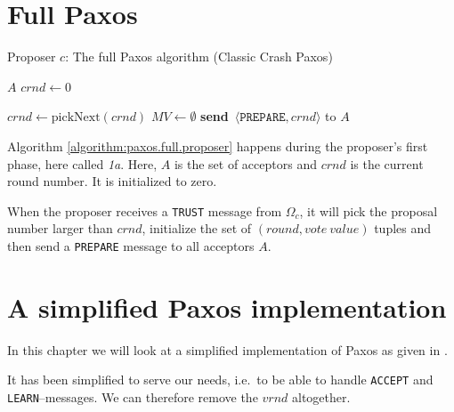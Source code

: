 \section{Full Paxos}


\begin{algorithm}[H]
  \caption{Proposer $c$: The full Paxos algorithm (Classic Crash Paxos)}
  \label{algorithm:paxos.full.proposer}
  \begin{algorithmic}
    \State $A$
    \State $crnd \leftarrow 0$

      \State $crnd \leftarrow \text{pickNext}(crnd)$
      \State $MV \leftarrow \emptyset$
      \State \textbf{send}~$\langle \texttt{PREPARE}, crnd \rangle$ to $A$
    \EndOn
  \end{algorithmic}
\end{algorithm}

Algorithm \ref{algorithm:paxos.full.proposer} happens during the proposer's
first phase, here called \textit{1a}.  Here, $A$ is the set of acceptors and
$crnd$ is the current round number.  It is initialized to zero.

When the proposer receives a \texttt{TRUST} message from $\Omega_c$, it will
pick the proposal number larger than $crnd$, initialize the set of
$(round, vote~value)$ tuples and then send a \texttt{PREPARE} message to all
acceptors $A$.

\section{A simplified Paxos implementation}

In this chapter we will look at a simplified implementation of Paxos as
given in \cite{Insane.Paxos}.

It has been simplified to serve our needs, i.e.~to be able to handle
\texttt{ACCEPT} and \texttt{LEARN}--messages.  We can therefore remove the
$vrnd$ altogether.


